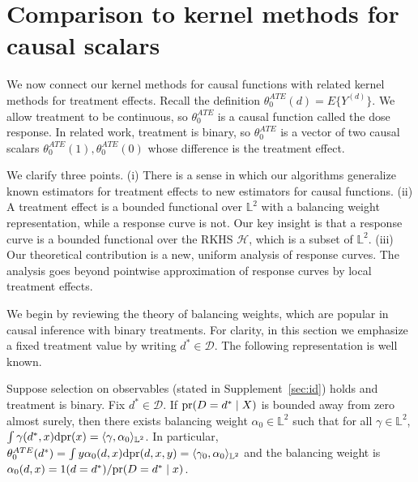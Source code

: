 \section{Comparison to kernel methods for causal scalars}\label{sec:detail}


We now connect our kernel methods for causal functions with related kernel methods for treatment effects. Recall the definition $\theta_0^{ATE}(d)=E\{Y^{(d)}\}$. We allow treatment to be continuous, so $\theta_0^{ATE}$ is a causal function called the dose response. In related work, treatment is binary, so $\theta_0^{ATE}$ is a vector of two causal scalars $\theta^{ATE}_0(1),\theta^{ATE}_0(0)$ whose difference is the treatment effect. 

We clarify three points. (i) There is a sense in which our algorithms generalize known estimators for treatment effects to new estimators for causal functions. (ii) A treatment effect is a bounded functional over $\mathbb{L}^2$ with a balancing weight representation, while a response curve is not. Our key insight is that a response curve is a bounded functional over the RKHS $\mathcal{H}$, which is a subset of $\mathbb{L}^2$. (iii) Our theoretical contribution is a new, uniform analysis of response curves. The analysis goes beyond pointwise approximation of response curves by local treatment effects.


We begin by reviewing the theory of balancing weights, which are popular in causal inference with binary treatments. For clarity, in this section we emphasize a fixed treatment value by writing $d^*\in \mathcal{D}$.  The following representation is well known.

\begin{proposition}\label{prop:balance_exists}
Suppose selection on observables (stated in Supplement~\ref{sec:id}) holds and treatment is binary. Fix $d^*\in\mathcal{D}$. If $\text{\normalfont pr}(D=d^* \mid X)$ is bounded away from zero almost surely, then there exists balancing weight $\alpha_0\in \mathbb{L}^2$ such that for all $\gamma\in \mathbb{L}^2$, $\int \gamma(d^*,x)\mathrm{d}\text{\normalfont pr}(x)=\langle \gamma,\alpha_0 \rangle_{\mathbb{L}^2}$. In particular, $\theta_0^{ATE}(d^*)=\int y\alpha_0(d,x)\mathrm{d}\text{\normalfont pr}(d,x,y)=\langle \gamma_0,\alpha_0 \rangle_{\mathbb{L}^2}$ and the balancing weight is $\alpha_0(d,x)=1(d=d^*)/\text{\normalfont pr}(D=d^* \mid x)$.
\end{proposition}

